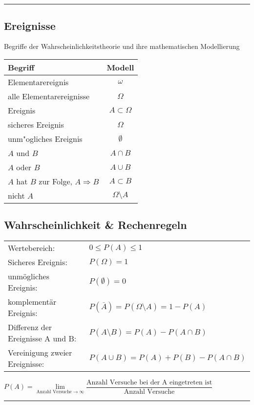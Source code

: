 \hrule
\vspace{.5cm}
\begin{minipage}[t]{6.5cm}
\subsection{Ereignisse }
Begriffe der Wahrscheinlichkeitstheorie und ihre mathematischen
Modellierung\\
\begin{tabular}{|l|c|}
\hline
Begriff&Modell\\
\hline
Elementarereignis&$\omega$\\
alle Elementarereignisse&$\Omega$\\
Ereignis&$A\subset\Omega$\\
sicheres Ereignis&$\Omega$\\
unm"ogliches Ereignis&$\emptyset$\\
$A$ und $B$&$A\cap B$\\
$A$ oder $B$&$A\cup B$\\
$A$ hat $B$ zur Folge, $A\Rightarrow B$&$A\subset B$\\
nicht $A$&$\Omega\setminus A$\\
\hline
\end{tabular}
\end{minipage}
\hspace{.5cm}
\begin{minipage}[t]{9cm}
\subsection{Wahrscheinlichkeit \& Rechenregeln }
\begin{tabular}{ll}
  Wertebereich: & ${0}\le{P(A)}\le{1}$\\
  Sicheres Ereignis:    & $P(\Omega)=1$\\
  unmögliches Ereignis: & $P(\emptyset)=0$\\
  komplementär Ereignis: & $P(\bar{A})=P({\Omega}\setminus{A})=1-P(A)$\\
  Differenz der Ereignisse A und B: & $P({A}\setminus{B})=P(A)-P({A}\cap{B})$\\
  Vereinigung zweier Ereignisse: & $P({A}\cup{B})=P(A)+P(B)-P({A}\cap{B})$\\
\end{tabular}
\begin{center}
$P(A)=\lim\limits_{\text{Anzahl Versuche} \to \infty} \dfrac{\text{Anzahl Versuche bei der A eingetreten ist}}{\text{Anzahl Versuche}}$\\
\end{center}
\end{minipage}
\vspace{.5cm}
\hrule

